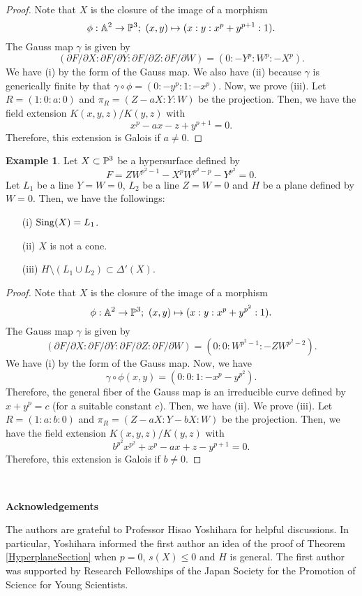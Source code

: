 \documentclass[10pt,oneside]{amsart}
\theoremstyle{definition}
\newtheorem{example}{Example}
\begin{document}
\begin{proof}
Note that $X$ is the closure of the image of a morphism 
$$ \phi:\Bbb A^2 \rightarrow \Bbb P^3; \ (x,y) \mapsto (x:y:x^p+y^{p+1}:1). $$ 
The Gauss map $\gamma$ is given by 
$$ (\partial F/\partial X:\partial F/\partial Y:\partial F/\partial Z:\partial F/\partial W)= (0:-Y^p:W^p:-X^p). $$
We have (i) by the form of the Gauss map. 
We also have (ii) because $\gamma$ is generically finite by that $\gamma \circ \phi=(0:-y^p:1:-x^p)$. 
Now, we prove (iii).  
Let $R=(1:0:a:0)$ and $\pi_R=(Z-aX:Y:W)$ be the projection. 
Then, we have the field extension $K(x,y,z)/K(y,z)$ with $$x^p-ax-z+y^{p+1}=0. $$ 
Therefore, this extension is Galois if $a \ne 0$. 
\end{proof} 

\begin{example}
Let $X \subset \Bbb P^3$ be a hypersurface defined by 
$$ F=ZW^{p^2-1}-X^pW^{p^2-p}-Y^{p^2}=0. $$ 
Let $L_1$ be a line $Y=W=0$, $L_2$ be a line $Z=W=0$ and $H$ be a plane defined by $W=0$. 
Then, we have the followings: 
\begin{itemize}
\item[(i)] ${\rm Sing}(X)=L_1$. 
\item[(ii)] $X$ is not a cone. 
\item[(iii)] $H \setminus (L_1 \cup L_2) \subset \Delta'(X)$. 
\end{itemize}
\end{example} 

\begin{proof}
Note that $X$ is the closure of the image of a morphism 
$$ \phi:\Bbb A^2 \rightarrow \Bbb P^3; \ (x,y) \mapsto (x:y:x^p+y^{p^2}:1). $$ 
The Gauss map $\gamma$ is given by 
$$ (\partial F/\partial X:\partial F/\partial Y:\partial F/\partial Z:\partial F/\partial W)= (0:0:W^{p^2-1}:-ZW^{p^2-2}). $$
We have (i) by the form of the Gauss map. 
Now, we have $$\gamma \circ \phi(x,y)=(0:0:1:-x^p-y^{p^2}). $$  
Therefore, the general fiber of the Gauss map is an irreducible curve defined by $x+y^p=c$ (for a suitable constant $c$). 
Then, we have (ii). 
We prove (iii). 
Let $R=(1:a:b:0)$ and $\pi_R=(Z-aX:Y-bX:W)$ be the projection. 
Then, we have the field extension $K(x,y,z)/K(y,z)$ with $$b^{p^2}x^{p^2}+x^p-ax+z-y^{p+1}=0. $$ 
Therefore, this extension is Galois if $b \ne 0$. 
\end{proof} 

\
\begin{center} {\bf Acknowledgements} \end{center} 
The authors are grateful to Professor Hisao Yoshihara for helpful discussions. 
In particular, Yoshihara informed the first author an idea of the proof of Theorem \ref{HyperplaneSection} when $p=0$, $s(X) \le 0$ and $H$ is general.  
The first author was supported by Research Fellowships of the Japan Society for the Promotion of Science for Young Scientists. 
\end{document}
